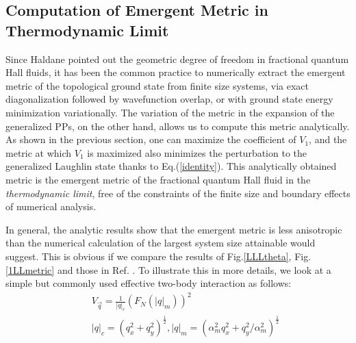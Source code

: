 \documentclass[twocolumn,showpacs,amsmath,amstex,amssymb,mathfonts,prb]{revtex4-1}
\begin{document}
\subsection{Computation of Emergent Metric in Thermodynamic Limit}

Since Haldane pointed out the geometric degree of freedom in fractional quantum Hall fluids\cite{qiu11,haldane3,haldane4}, it has been the common practice to numerically extract the emergent metric of the topological ground state from finite size systems, via exact diagonalization followed by wavefunction overlap, or with ground state energy minimization variationally\cite{yang1,zlatko,regnault}. The variation of the metric in the expansion of the generalized PPs, on the other hand, allows us to compute this metric analytically. As shown in the previous section, one can maximize the coefficient of $V_1$, and the metric at which $V_1$ is maximized also minimizes the perturbation to the generalized Laughlin state thanks to Eq.(\ref{identity}). This analytically obtained metric is the emergent metric of the fractional quantum Hall fluid in the \emph{thermodynamic limit}, free of the constraints of the finite size and boundary effects of numerical analysis. 

In general, the analytic results show that the emergent metric is less anisotropic than the numerical calculation of the largest system size attainable would suggest. This is obvious if we compare the results of Fig.\ref{LLLtheta}, Fig. \ref{1LLmetric} and those in Ref. . To illustrate this in more details, we look at a simple but commonly used effective two-body interaction as follows:
\begin{eqnarray}
&&V_{\vec q}=\frac{1}{|q|_c}\left(F_N\left(|q|_m\right)\right)^2\label{simplev}\\
&&|q|_c=\left(q_x^2+q_y^2\right)^{\frac{1}{2}},|q|_m=\left(\alpha_m^2q_x^2+q_y^2/\alpha_m^2\right)^{\frac{1}{2}}
\end{eqnarray}
\end{document}
